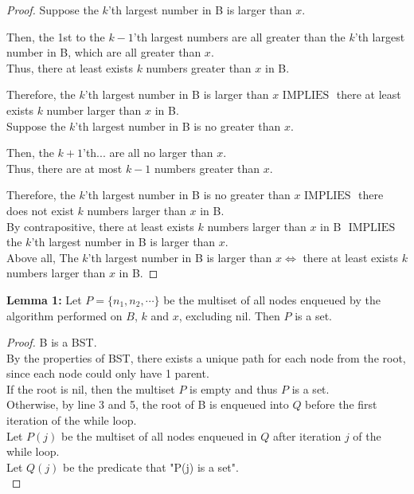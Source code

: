 \documentclass[10pt]{article}
\newcommand{\iimplies}{\mbox{ IMPLIES }}
\begin{document}
\begin{enumerate}
\begin{addmargin}[1em]{0em}
    \begin{proof}
        Suppose the $k$'th largest number in B is larger than $x$. 
        \begin{addmargin}[1em]{0em}
            Then, the 1st to the $k-1$'th largest numbers are all greater than the $k$'th largest number in B, which are all greater than $x$. \\
            Thus, there at least exists $k$ numbers greater than $x$ in B. 
        \end{addmargin}
        Therefore, the $k$'th largest number in B is larger than $x \iimplies$ there at least exists $k$ number larger than $x$ in B. \\

        Suppose the $k$'th largest number in B is no greater than $x$.
        \begin{addmargin}[1em]{0em}
            Then, the $k+1$'th... are all no larger than $x$. \\
            Thus, there are at most $k-1$ numbers greater than $x$.
        \end{addmargin}
        Therefore, the $k$'th largest number in B is no greater than $x \iimplies$ there does not exist $k$ numbers larger than $x$ in B. \\
        By contrapositive, there at least exists $k$ numbers larger than $x$ in B $\iimplies$ the $k$'th largest number in B is larger than $x$. \\

        Above all, The $k$'th largest number in B is larger than $x \iff$ there at least exists $k$ numbers larger than $x$ in B. 
    \end{proof}
\end{addmargin}

\begin{addmargin}[1em]{0em}
    \textbf{Lemma 1:} Let $P=\{n_1,n_2, \cdots\}$ be the multiset of all nodes enqueued by the algorithm performed on $B$, $k$ and $x$, excluding nil.
    Then $P$ is a set.
    \begin{proof}
        B is a BST. \\
        By the properties of BST, there exists a unique path for each node from the root, since each node could only have 1 parent. \\
        If the root is nil, then the multiset $P$ is empty and thus $P$ is a set. \\
        Otherwise, by line 3 and 5, the root of B is enqueued into $Q$ before the first iteration of the while loop. \\
        Let $P(j)$ be the multiset of all nodes enqueued in $Q$ after iteration $j$ of the while loop. \\
        Let $Q(j)$ be the predicate that "P(j) is a set". \\


\end{proof}
\end{addmargin}
\end{enumerate}
\end{document}
